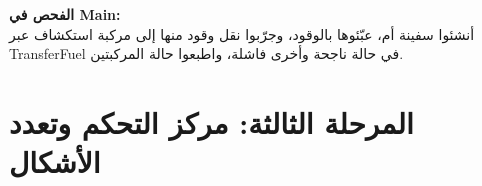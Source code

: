 \documentclass[14pt]{extarticle}
\begin{document}
\begin{enumerate}[resume, label=\textbf{تمرين \arabic*:}, wide=0pt, leftmargin=*, itemsep=2.2em]
    \vspace{2em}
    \noindent \textbf{الفحص في \textenglish{Main}:} \\
    أنشئوا سفينة أم، عبّئوها بالوقود، وجرّبوا نقل وقود منها إلى مركبة استكشاف عبر \textenglish{TransferFuel} في حالة ناجحة وأخرى فاشلة، واطبعوا حالة المركبتين.

\end{enumerate}

\clearpage

\section*{المرحلة الثالثة: مركز التحكم وتعدد الأشكال}
\end{document}

